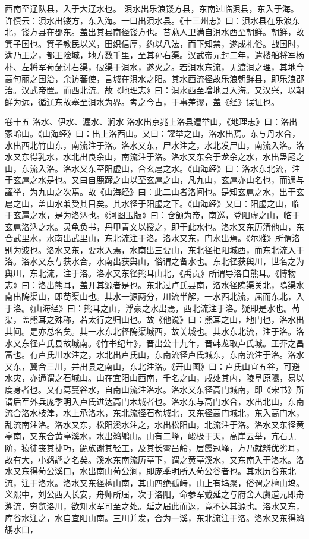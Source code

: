 \documentclass[12pt,UTF8]{ctexbook}
\begin{document}
西南至辽队县，入于大辽水也。
浿水出乐浪镂方县，东南过临浿县，东入于海。
许慎云：浿水出镂方，东入海。一曰出浿水县。《十三州志》曰：浿水县在乐浪东北，镂方县在郡东。盖出其县南径镂方也。昔燕人卫满自浿水西至朝鲜。朝鲜，故箕子国也。箕子教民以义，田织信厚，约以八法，而下知禁，遂成礼俗。战国时，满乃王之，都王险城，地方数千里，至其孙右渠。汉武帝元封二年，遣楼船将军杨朴、左将军荀彘讨右渠，破渠于浿水，遂灭之。若浿水东流，无渡浿之理，其地今高句丽之国治，余访蕃使，言城在浿水之阳。其水西流径故乐浪朝鲜县，即乐浪郡治。汉武帝置。而西北流。故《地理志》曰：浿水西至增地县入海。又汉兴，以朝鲜为远，循辽东故塞至浿水为界。考之今古，于事差谬，盖《经》误证也。


卷十五  洛水、伊水、瀍水、涧水 
洛水出京兆上洛县遭举山，《地理志》曰：洛出冢岭山。《山海经》曰：出上洛西山。又曰：讙举之山，洛水出焉。东与丹水合，水出西北竹山东，南流注于洛。洛水又东，尸水注之，水北发尸山，南流入洛。洛水又东得乳水，水北出良余山，南流注于洛。洛水又东会于龙余之水，水出蛊尾之山，东流入洛。洛水又东至阳虚山，合玄扈之水。《山海经》曰：洛水东北流，注于玄扈之水是也。又曰自鹿蹄之山以至玄扈之山，凡九山，玄扈亦山名也，而通与讙举，为九山之次焉。故《山海经》曰：此二山者洛间也。是知玄扈之水，出于玄扈之山，盖山水兼受其目矣。其水径于阳虚之下。《山海经》又曰：阳虚之山，临于玄扈之水，是为洛汭也。《河图玉版》曰：仓颌为帝，南巡，登阳虚之山，临于玄扈洛汭之水。灵龟负书，丹甲青文以授之，即于此水也。洛水又东历清他山，东合武里水，水南出武里山，东北流注于洛。洛水又东，门水出焉。《尔雅》所谓洛别为波也。洛水又东，要水入焉，水南出三要山，东北径拒阳城西，而东北流入于洛。洛水又东与获水合，水南出获舆山，俗谓之备水也。东北径获舆川，世名之为舆川，东北流，注于洛。洛水又东径熊耳山北，《禹贡》所谓导洛自熊耳。《博物志》曰：洛出熊耳，盖开其源者是也。东北过卢氏县南，洛水径隖渠关北，隖渠水南出隖渠山，即荀渠山也。其水一源两分，川流半解，一水西北流，屈而东北，入于洛。《山海经》曰：熊耳之山，浮豪之水出焉，西北流注于洛。疑即是水也。荀渠，盖熊耳之殊称，若太行之归山也。故《他说》曰：熊耳之山，地门也，洛水出其间。是亦总名矣。其一水东北径隖渠城西，故关城也。其水东北流，注于洛。洛水又东径卢氏县故城南。《竹书纪年》，晋出公十九年，晋韩龙取卢氏城。王莽之昌富也。有卢氏川水注之，水北出卢氏山，东南流径卢氏城东，东南流注于洛。洛水又东，翼合三川，并出县之南山，东北注洛。《开山图》曰：卢氏山宜五谷，可避水灾，亦通谓之石城山。山在宜阳山西南，千名之山，咸处其内，陵阜原隰，易以度身者也。又有葛蔓谷水，自南山流注洛水。洛水又东径高门城南，即《宋书》所谓后军外兵庞季明入卢氏进达高门木城者也。洛水东与高门水合，水出北山，东南流合洛水枝津，水上承洛水，东北流径石勒城北，又东径高门城北，东入高门水，乱流南注洛。洛水又东，松阳溪水注之，水出松阳山，北流注于洛。洛水又东径黄亭南，又东合黄亭溪水，水出鹈鹕山。山有二峰，峻极于天，高崖云举，亢石无阶，猿徒丧其捷巧，鼯族谢其轻工，及其长霄昌岭，层霞冠峰，方乃就辨优劣耳，故有大，小鹈鹕之名矣。溪水东南流历亭下，谓之黄亭溪水，又东南入于洛水。洛水又东得荀公溪口，水出南山荀公涧，即庞季明所入荀公谷者也。其水历谷东北流，注于洛水。洛水又东径檀山南，其山四绝孤峙，山上有坞聚，俗谓之檀山坞。义熙中，刘公西入长安，舟师所届，次于洛阳，命参军戴延之与府舍人虞道元即舟溯流，穷览洛川，欲知水军可至之处。延之届此而返，竟不达其源也。洛水又东，库谷水注之，水自宜阳山南。三川并发，合为一溪，东北流注于洛。洛水又东得鹈鹕水口，
\end{document}
